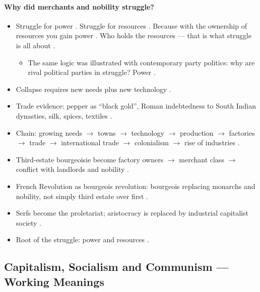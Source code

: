 \paragraph{Why did merchants and nobility struggle?}
\begin{itemize}
    \item Struggle for power . Struggle for resources . Because with the ownership of resources you gain power . Who holds the resources --- that is what struggle is all about .
    \begin{itemize}
        \item The same logic was illustrated with contemporary party politics: why are rival political parties in struggle? Power .
    \end{itemize}
\end{itemize}

\begin{QuickRevision}
\begin{itemize}
    \item Collapse requires new needs plus new technology .
    \item Trade evidence: pepper as ``black gold'', Roman indebtedness to South Indian dynasties, silk, spices, textiles .
    \item Chain: growing needs $\rightarrow$ towns $\rightarrow$ technology $\rightarrow$ production $\rightarrow$ factories $\rightarrow$ trade $\rightarrow$ international trade $\rightarrow$ colonialism $\rightarrow$ rise of industries .
    \item Third-estate bourgeoisie become factory owners $\rightarrow$ merchant class $\rightarrow$ conflict with landlords and nobility .
    \item French Revolution as bourgeois revolution: bourgeois replacing monarchs and nobility, not simply third estate over first .
    \item Serfs become the proletariat; aristocracy is replaced by industrial capitalist society .
    \item Root of the struggle: power and resources .
\end{itemize}
\end{QuickRevision}

\subsection{Capitalism, Socialism and Communism --- Working Meanings}


